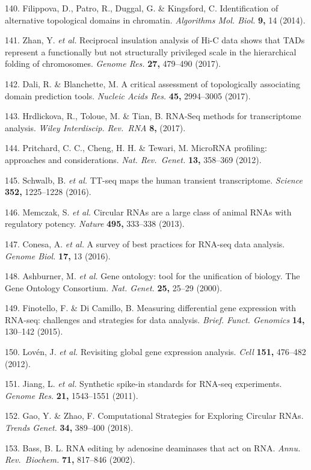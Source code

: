 \documentclass[11pt,twoside]{MPIthesis}
\theoremstyle{definition}
\theoremstyle{definition}
\theoremstyle{definition}
\theoremstyle{remark}
\begin{document}
140. Filippova, D., Patro, R., Duggal, G. \& Kingsford, C.
Identification of alternative topological domains in chromatin.
\emph{Algorithms Mol. Biol.} \textbf{9,} 14 (2014).

141. Zhan, Y. \emph{et al.} Reciprocal insulation analysis of Hi-C data
shows that TADs represent a functionally but not structurally privileged
scale in the hierarchical folding of chromosomes. \emph{Genome Res.}
\textbf{27,} 479--490 (2017).

142. Dali, R. \& Blanchette, M. A critical assessment of topologically
associating domain prediction tools. \emph{Nucleic Acids Res.}
\textbf{45,} 2994--3005 (2017).

143. Hrdlickova, R., Toloue, M. \& Tian, B. RNA-Seq methods for
transcriptome analysis. \emph{Wiley Interdiscip. Rev.~RNA} \textbf{8,}
(2017).

144. Pritchard, C. C., Cheng, H. H. \& Tewari, M. MicroRNA profiling:
approaches and considerations. \emph{Nat. Rev.~Genet.} \textbf{13,}
358--369 (2012).

145. Schwalb, B. \emph{et al.} TT-seq maps the human transient
transcriptome. \emph{Science} \textbf{352,} 1225--1228 (2016).

146. Memczak, S. \emph{et al.} Circular RNAs are a large class of animal
RNAs with regulatory potency. \emph{Nature} \textbf{495,} 333--338
(2013).

147. Conesa, A. \emph{et al.} A survey of best practices for RNA-seq
data analysis. \emph{Genome Biol.} \textbf{17,} 13 (2016).

148. Ashburner, M. \emph{et al.} Gene ontology: tool for the unification
of biology. The Gene Ontology Consortium. \emph{Nat. Genet.}
\textbf{25,} 25--29 (2000).

149. Finotello, F. \& Di Camillo, B. Measuring differential gene
expression with RNA-seq: challenges and strategies for data analysis.
\emph{Brief. Funct. Genomics} \textbf{14,} 130--142 (2015).

150. Lovén, J. \emph{et al.} Revisiting global gene expression analysis.
\emph{Cell} \textbf{151,} 476--482 (2012).

151. Jiang, L. \emph{et al.} Synthetic spike-in standards for RNA-seq
experiments. \emph{Genome Res.} \textbf{21,} 1543--1551 (2011).

152. Gao, Y. \& Zhao, F. Computational Strategies for Exploring Circular
RNAs. \emph{Trends Genet.} \textbf{34,} 389--400 (2018).

153. Bass, B. L. RNA editing by adenosine deaminases that act on RNA.
\emph{Annu. Rev.~Biochem.} \textbf{71,} 817--846 (2002).
\end{document}
